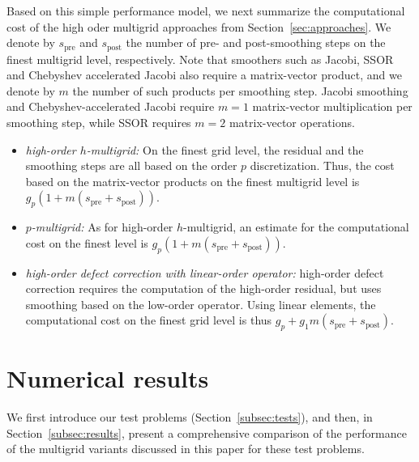 \documentclass[smallcondensed,final]{svjour3}     %
\begin{document}
Based on this simple performance model, we next summarize the
computational cost of the high oder multigrid approaches from
Section~\ref{sec:approaches}. We denote by $s_\text{pre}$ and
$s_\text{post}$ the number of pre- and post-smoothing steps on the
finest multigrid level, respectively. Note that smoothers such as
Jacobi, SSOR and Chebyshev accelerated Jacobi also require a
matrix-vector product, and we denote by $m$ the number of such
products per smoothing step.  Jacobi smoothing and
Chebyshev-accelerated Jacobi require $m=1$ matrix-vector
multiplication per smoothing step, while SSOR requires $m=2$
matrix-vector operations.

\begin{itemize}
\item {\em high-order $h$-multigrid:} On the finest grid level, the
  residual and the smoothing steps are all based on the order $p$
  discretization. Thus, the cost based on the matrix-vector products
  on the finest multigrid level is
  $g_p(1+m(s_\text{pre}+s_\text{post}))$.

\item {\em $p$-multigrid:} As for high-order $h$-multigrid, an
  estimate for the computational cost on the finest level is
  $g_p(1+m(s_\text{pre}+s_\text{post}))$.

\item {\em high-order defect correction with linear-order operator:}
  high-order defect correction requires the computation of the
  high-order residual, but uses smoothing based on the low-order
  operator. Using linear elements, the computational cost on the
  finest grid level is thus
  $g_p+g_1m(s_\text{pre}+s_\text{post})$.
\end{itemize}


\section{Numerical results}\label{sec:numerics}
We first introduce our test problems (Section~\ref{subsec:tests}), and
then, in Section~\ref{subsec:results}, present a comprehensive
comparison of the performance of the multigrid variants discussed
in this paper for these test problems.
\end{document}
